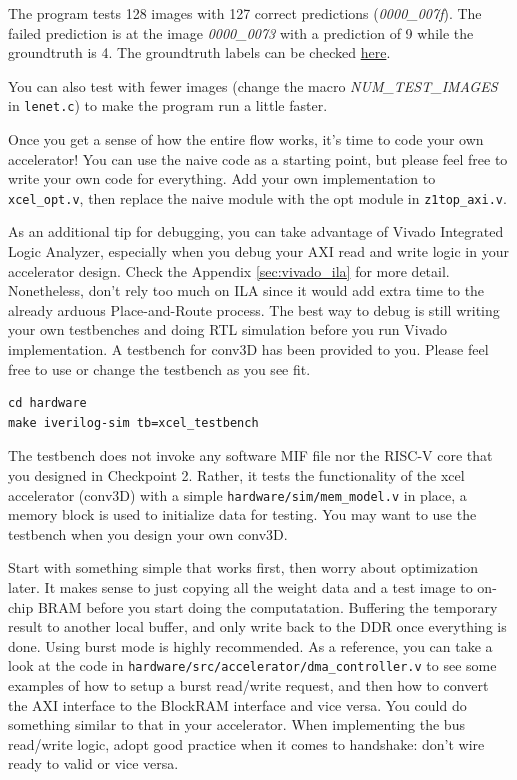 \documentclass[11pt]{article}
\begin{document}
The program tests 128 images with 127 correct predictions (\textit{0000\_007f}).
The failed prediction is at the image \textit{0000\_0073} with a prediction of 9
while the groundtruth is 4. The groundtruth labels can be checked \href{https://github.com/EECS150/arm_baremetal_app/blob/main/system/src/labels.h}{here}.

You can also test with fewer images (change the macro \textit{NUM\_TEST\_IMAGES} in \verb|lenet.c|) to make the program run a little faster.

Once you get a sense of how the entire flow works, it's time to code your own accelerator!
You can use the naive code as a starting point, but please feel free to write your own code for everything.
Add your own implementation to \verb|xcel_opt.v|, then replace the naive module with the opt module
in \verb|z1top_axi.v|.

As an additional tip for debugging, you can take advantage of Vivado Integrated Logic Analyzer, especially when you debug your AXI read and write logic in your accelerator design. Check the Appendix \ref{sec:vivado_ila} for more detail. Nonetheless, don't rely too much on ILA since it would add extra time to the already arduous Place-and-Route process. The best way to debug is still writing your own testbenches and doing RTL simulation before you run Vivado implementation. A testbench for conv3D has been provided to you. Please feel free to use or change the testbench as you see fit.

\begin{verbatim}
cd hardware
make iverilog-sim tb=xcel_testbench
\end{verbatim}

The testbench does not invoke any software MIF file nor the RISC-V core that you designed in Checkpoint 2. Rather, it tests the functionality of the xcel accelerator (conv3D) with a simple \verb|hardware/sim/mem_model.v| in place, a memory block is used to initialize data for testing. You may want to use the testbench when you design your own conv3D.

Start with something simple that works first, then worry about optimization later. It makes sense to just copying all the weight data and a test image to on-chip BRAM before you start doing the computatation. Buffering the temporary result to another local buffer, and only write back to the DDR once everything is done. Using burst mode is highly recommended. As a reference, you can take a look at the code in \verb|hardware/src/accelerator/dma_controller.v| to see some examples of how to setup a burst read/write request, and then how to convert the AXI interface to the BlockRAM interface and vice versa. You could do something similar to that in your accelerator. When implementing the bus read/write logic, adopt good practice when it comes to handshake: don't wire ready to valid or vice versa.
\end{document}
